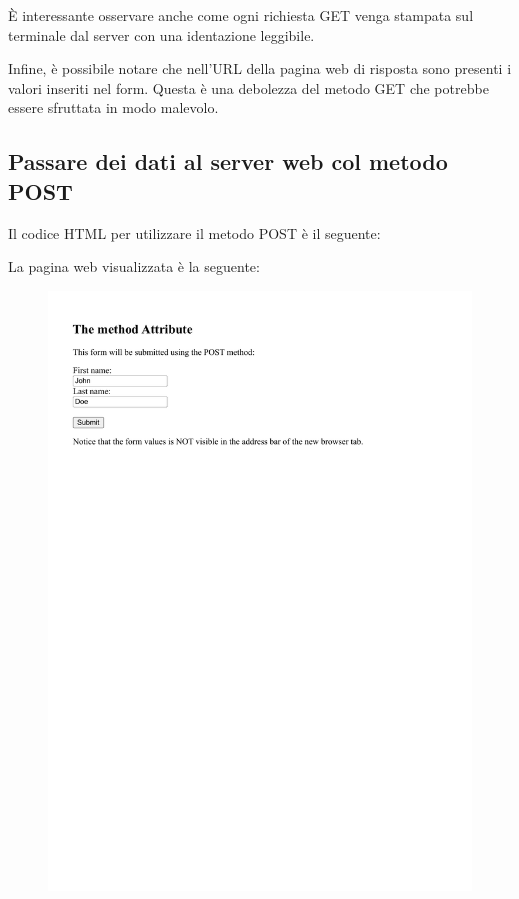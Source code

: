 \documentclass[a4paper]{article}
\begin{document}
	\noindent
	È interessante osservare anche come ogni richiesta GET venga stampata sul terminale dal server con una identazione leggibile.\newline
	
	\noindent
	Infine, è possibile notare che nell'URL della pagina web di risposta sono presenti i valori inseriti nel form. Questa è una debolezza del metodo GET che potrebbe essere sfruttata in modo malevolo.\newpage

	\subsection{Passare dei dati al server web col metodo POST}
	
	Il codice HTML per utilizzare il metodo POST è il seguente:
	
	La pagina web visualizzata è la seguente:
	\begin{figure}[!htp]
		\centering
		\includegraphics[width=\textwidth]{img/form-post.pdf}
	\end{figure}
	
\end{document}
